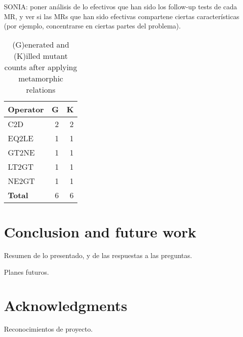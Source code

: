 SONIA: poner análisis de lo efectivos que han sido los follow-up tests de cada MR, y ver si las MRs que han sido efectivas compartene ciertas características (por ejemplo, concentrarse en ciertas partes del problema).

\begin{table}
    \centering
    \begin{tabular}{lrr}
    \toprule
    \textbf{Operator} & \textbf{G} &  \textbf{K} \\
    \midrule
C2D         & 2 & 2 \\
EQ2LE   & 1     & 1 \\
GT2NE   & 1     & 1 \\
LT2GT   & 1     & 1 \\
NE2GT   & 1     & 1 \\

    \midrule
    \textbf{Total} & 6 & 6  \\
    \bottomrule
    \end{tabular}
    \caption{(G)enerated and (K)illed mutant counts after applying metamorphic relations}
    \label{tab:mutant-counts2}
\end{table}






\section{Conclusion and future work}

Resumen de lo presentado, y de las respuestas a las preguntas.

Planes futuros.

\section*{Acknowledgments}

Reconocimientos de proyecto.



\appendix



